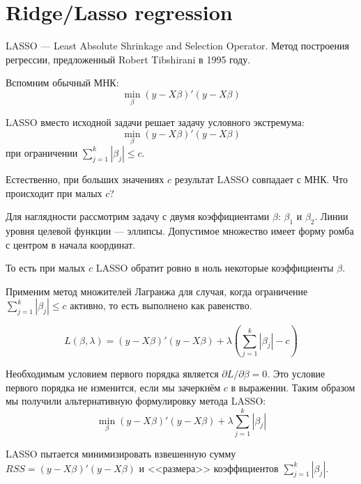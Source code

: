 \documentclass[pdftex,12pt,a4paper]{article}
\begin{document}
\section{Ridge/Lasso regression}

LASSO --- Least Absolute Shrinkage and Selection Operator. Метод построения регрессии, предложенный Robert Tibshirani в 1995 году.

Вспомним обычный МНК:
\begin{equation}
\min_{\beta} (y-X\beta)'(y-X\beta)
\end{equation}


LASSO вместо исходной задачи решает задачу условного экстремума:
\begin{equation}
\min_{\beta} (y-X\beta)'(y-X\beta)
\end{equation}
при ограничении $\sum_{j=1}^{k}|\beta_j|\leq c$.


Естественно, при больших значениях $c$ результат LASSO совпадает с МНК. Что происходит при малых $c$?


Для наглядности рассмотрим задачу с двумя коэффициентами $\beta$: $\beta_1$ и $\beta_2$. Линии уровня целевой функции --- эллипсы. Допустимое множество имеет форму ромба с центром в начала координат.




То есть при малых $c$ LASSO обратит ровно в ноль некоторые коэффициенты $\beta$.


Применим метод множителей Лагранжа для случая, когда ограничение $\sum_{j=1}^{k}|\beta_j|\leq c$ активно, то есть выполнено как равенство. 

\begin{equation}
L(\beta,\lambda)=(y-X\beta)'(y-X\beta)+\lambda \left(\sum_{j=1}^{k}|\beta_j| - c \right)
\end{equation}

Необходимым условием первого порядка является $\partial L/\partial \beta =0$. 
Это условие первого порядка не изменится, если мы зачеркнём $c$ в выражении. 
Таким образом мы получили альтернативную формулировку метода LASSO:
\begin{equation}
\min_{\beta} (y-X\beta)'(y-X\beta)+\lambda \sum_{j=1}^{k}|\beta_j|
\end{equation}

LASSO пытается минимизировать взвешенную сумму $RSS=(y-X\beta)'(y-X\beta)$ и <<размера>> коэффициентов $\sum_{j=1}^{k}|\beta_j|$.
\end{document}
